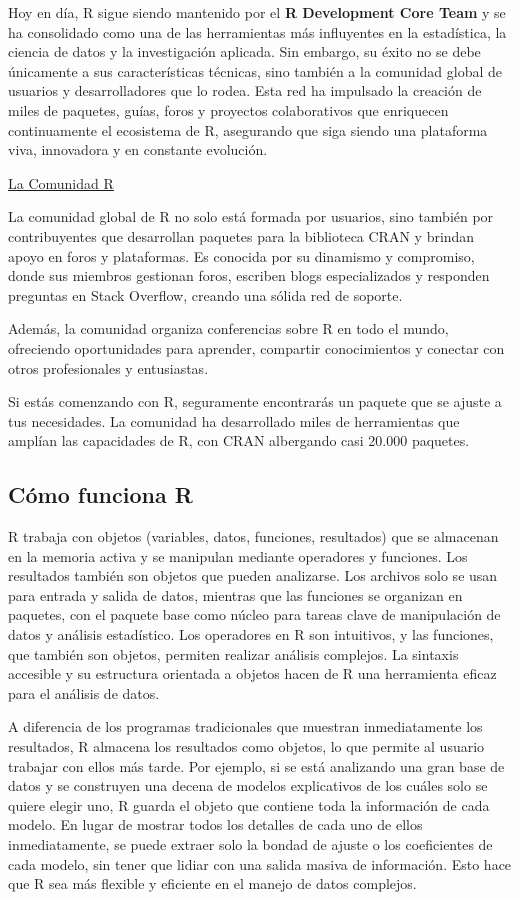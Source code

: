 \documentclass[
  letterpaper,
]{scrbook}
\begin{document}
Hoy en día, R sigue siendo mantenido por el \textbf{R Development Core
Team} y se ha consolidado como una de las herramientas más influyentes
en la estadística, la ciencia de datos y la investigación aplicada. Sin
embargo, su éxito no se debe únicamente a sus características técnicas,
sino también a la comunidad global de usuarios y desarrolladores que lo
rodea. Esta red ha impulsado la creación de miles de paquetes, guías,
foros y proyectos colaborativos que enriquecen continuamente el
ecosistema de R, asegurando que siga siendo una plataforma viva,
innovadora y en constante evolución.

\uline{La Comunidad R}

La comunidad global de R no solo está formada por usuarios, sino también
por contribuyentes que desarrollan paquetes para la biblioteca CRAN y
brindan apoyo en foros y plataformas. Es conocida por su dinamismo y
compromiso, donde sus miembros gestionan foros, escriben blogs
especializados y responden preguntas en Stack Overflow, creando una
sólida red de soporte.

Además, la comunidad organiza conferencias sobre R en todo el mundo,
ofreciendo oportunidades para aprender, compartir conocimientos y
conectar con otros profesionales y entusiastas.

Si estás comenzando con R, seguramente encontrarás un paquete que se
ajuste a tus necesidades. La comunidad ha desarrollado miles de
herramientas que amplían las capacidades de R, con CRAN albergando casi
20.000 paquetes.

\hypertarget{cuxf3mo-funciona-r}{%
\subsection{Cómo funciona R}\label{cuxf3mo-funciona-r}}

R trabaja con objetos (variables, datos, funciones, resultados) que se
almacenan en la memoria activa y se manipulan mediante operadores y
funciones. Los resultados también son objetos que pueden analizarse. Los
archivos solo se usan para entrada y salida de datos, mientras que las
funciones se organizan en paquetes, con el paquete base como núcleo para
tareas clave de manipulación de datos y análisis estadístico. Los
operadores en R son intuitivos, y las funciones, que también son
objetos, permiten realizar análisis complejos. La sintaxis accesible y
su estructura orientada a objetos hacen de R una herramienta eficaz para
el análisis de datos.

A diferencia de los programas tradicionales que muestran inmediatamente
los resultados, R almacena los resultados como objetos, lo que permite
al usuario trabajar con ellos más tarde. Por ejemplo, si se está
analizando una gran base de datos y se construyen una decena de modelos
explicativos de los cuáles solo se quiere elegir uno, R guarda el objeto
que contiene toda la información de cada modelo. En lugar de mostrar
todos los detalles de cada uno de ellos inmediatamente, se puede extraer
solo la bondad de ajuste o los coeficientes de cada modelo, sin tener
que lidiar con una salida masiva de información. Esto hace que R sea más
flexible y eficiente en el manejo de datos complejos.
\end{document}
